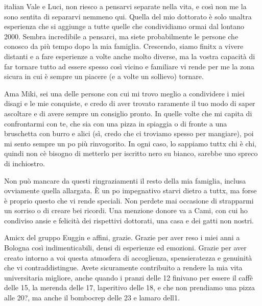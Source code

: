 \begin{otherlanguage*}{italian}
Vale e Luci, non riesco a pensarvi separate nella vita, e così non me la sono sentita di separarvi nemmeno qui. Quella del mio dottorato è solo un\curlyapostrophe{}altra esperienza che si aggiunge a tutte quelle che condividiamo ormai dal lontano 2000. Sembra incredibile a pensarci, ma siete probabilmente le persone che conosco da più tempo dopo la mia famiglia. Crescendo, siamo finitx a vivere distanti e a fare esperienze a volte anche molto diverse, ma la vostra capacità di far tornare tutto ad essere spesso così vicino e familiare vi rende per me la zona sicura in cui è sempre un piacere (e a volte un sollievo) tornare.

Ama Miki, sei una delle persone con cui mi trovo meglio a condividere i miei disagi e le mie conquiste, e credo di aver trovato raramente il tuo modo di saper ascoltare e di avere sempre un consiglio pronto. In quelle volte che mi capita di confrontarmi con te, che sia con una pizza in spiaggia o di fronte a una bruschetta con burro e alici (sì, credo che ci troviamo spesso per mangiare), poi mi sento sempre un po\curlyapostrophe{} più rinvogorito. In ogni caso, lo sappiamo tuttx chi è chi, quindi non c\curlyapostrophe{}è bisogno di metterlo per iscritto nero su bianco, sarebbe uno spreco di inchiostro. 

Non può mancare da questi ringraziamenti il resto della mia famiglia, inclusa ovviamente quella allargata. È un po\curlyapostrophe{} impegnativo starvi dietro a tuttx, ma forse è proprio questo che vi rende speciali. Non perdete mai occasione di strapparmi un sorriso o di creare bei ricordi. Una menzione d\curlyapostrophe{}onore va a Cami, con cui ho condiviso ansie e felicità dei rispettivi dottorati, una casa e dei gatti non nostri. 

Amicx del gruppo Euggin e affini, grazie. Grazie per aver reso i miei anni a Bologna così indimenticabili, densi di esperienze ed emozioni. Grazie per aver creato intorno a voi questa atmosfera di accoglienza, spensieratezza e genuinità che vi contraddistingue. Avete sicuramente contribuito a rendere la mia vita universitaria migliore, anche quando i pranzi delle 12 finivano per essere il caffè delle 15, la merenda delle 17, l\curlyapostrophe{}aperitivo delle 18, e che non prendiamo una pizza alle 20?, ma anche il bombocrep delle 23 e l\curlyapostrophe{}amaro dell\curlyapostrophe{}1.


\end{otherlanguage*}
